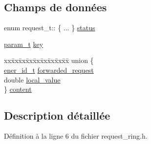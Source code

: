 \subsection*{Champs de données}
\begin{DoxyCompactItemize}
\item 
enum request\+\_\+t\+:: \{ ... \}  \hyperlink{structrequest__t_a091a4bcea10a60e492f6d5e0701971b1}{status}
\item 
\hyperlink{structparam__t}{param\+\_\+t} \hyperlink{structrequest__t_aecda29724bf99d52cb493c1230c78c56}{key}
\item 
\begin{tabbing}
xx\=xx\=xx\=xx\=xx\=xx\=xx\=xx\=xx\=\kill
union \{\\
\>\hyperlink{global_8h_a596407b6fb2365e332aae2fa812dadc7}{ener\_id\_t} \hyperlink{structrequest__t_a89f0d4bedb0b3309d3788d83361fca7b}{forwarded\_request}\\
\>double \hyperlink{structrequest__t_adfaf572f76ed3e073cf055e07fc2c78b}{local\_value}\\
\} \hyperlink{structrequest__t_a6729b77b960ade21ba25c05752728d1d}{content}\\

\end{tabbing}\end{DoxyCompactItemize}


\subsection{Description détaillée}


Définition à la ligne 6 du fichier request\+\_\+ring.\+h.



